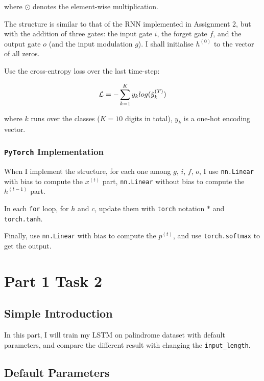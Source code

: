 \documentclass{article}
\begin{document}
where $\odot$ denotes the element-wise multiplication.

The structure is similar to that of the RNN implemented in Assignment 2, but with the addition of three gates: the input gate $i$, the forget gate $f$, and the output gate $o$ (and the input modulation $g$). I shall initialise $h^{(0)}$ to the vector of all zeros.

Use the cross-entropy loss over the last time-step:

\begin{equation}
    \mathcal{L} = -\sum\limits_{k=1}^{K}y_{k}log(\Tilde{y}_{k}^{(T)})
\end{equation}

where $k$ runs over the classes ($K = 10$ digits in total), $y_k$ is a one-hot encoding vector.

\subsubsection{\texttt{PyTorch} Implementation}

When I implement the structure, for each one among $g$, $i$, $f$, $o$, I use \texttt{nn.Linear} with bias to compute the $x^{(t)}$ part, \texttt{nn.Linear} without bias to compute the $h^{(t-1)}$ part.

In each \texttt{for} loop, for $h$ and $c$, update them with \texttt{torch} notation $*$ and \texttt{torch.tanh}.

Finally, use \texttt{nn.Linear} with bias to compute the $p^{(t)}$, and use \texttt{torch.softmax} to get the output.

\section{Part 1 Task 2}

\subsection{Simple Introduction}

In this part, I will train my LSTM on palindrome dataset with default parameters, and compare the different result with changing the \texttt{input\_length}.

\subsection{Default Parameters}
\end{document}
